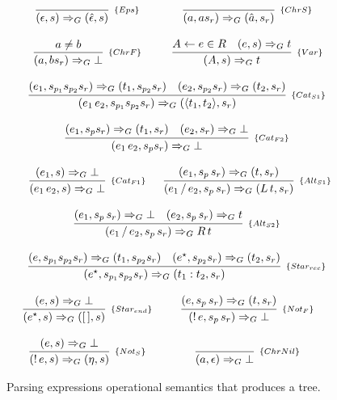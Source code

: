 \begin{figure*}[!h]
   \[
      \begin{array}{cc}
         \infer[_{\{Eps\}}]{(\epsilon,s) \Rightarrow_G (\hat{\epsilon},s)}{} &
         \infer[_{\{ChrS\}}]{(a,as_r) \Rightarrow_G (\hat{a},s_r)}{} \\ \\
         \infer[_{\{ChrF\}}]{(a,bs_r) \Rightarrow_G \bot}{a \neq b} &
         \infer[_{\{Var\}}]{(A,s) \Rightarrow_G t}
                        {A \leftarrow e \in R & (e,s) \Rightarrow_G t} \\ \\
         \multicolumn{2}{c}{
            \infer[_{\{Cat_{S1}\}}]{(e_1\,e_2,s_{p_1}s_{p_2}s_r) \Rightarrow_G (\langle t_1,t_2 \rangle, s_r)}
                                 {(e_1,s_{p_1}s_{p_2}s_r) \Rightarrow_G (t_1,s_{p_2}s_r) &
                                 (e_2,s_{p_2}s_r)\Rightarrow_G (t_2,s_r)}
         } \\ \\
         \multicolumn{2}{c}{
            \infer[_{\{Cat_{F2}\}}]{(e_1\,e_2,s_ps_r) \Rightarrow_G \bot}
                                 { (e_1,s_ps_r) \Rightarrow_G (t_1,s_r) &
                                    (e_2,s_r) \Rightarrow_G \bot}} \\ \\
         \infer[_{\{Cat_{F1}\}}]{(e_1\,e_2,s)\Rightarrow_G \bot}{(e_1,s) \Rightarrow_G \bot} &
         \infer[_{\{Alt_{S1}\}}]{(e_1\,/\,e_2,s_p\,s_r) \Rightarrow_G (L \, t,s_r)}
                                {(e_1,s_p\,s_r)\Rightarrow_G (t,s_r)} \\ \\
         \multicolumn{2}{c}{
            \infer[_{\{Alt_{S2}\}}]{(e_1\,/\,e_2,s_p\,s_r) \Rightarrow_G R \, t}
                                  {(e_1,s_p\,s_r)\Rightarrow_G \bot &
                                   (e_2,s_p\,s_r)\Rightarrow_G t}
         } \\ \\
         \multicolumn{2}{c}{
            \infer[_{\{Star_{rec}\}}]{(e^\star,s_{p_1}s_{p_2}s_r) \Rightarrow_G (t_1 : t_2,s_r)}
                                 {(e,s_{p_1}s_{p_2}s_r) \Rightarrow_G (t_1,s_{p_2}s_r) &
                                  (e^\star, s_{p_2}s_r) \Rightarrow_G (t_2,s_r)}
         } \\ \\
         \infer[_{\{Star_{end}\}}]{(e^\star,s) \Rightarrow_G ([\,],s)}
                                    {(e,s) \Rightarrow_G \bot} &
         \infer[_{\{Not_F\}}]{(!\,e,s_p\,s_r) \Rightarrow_G \bot}
                          {(e,s_p\,s_r) \Rightarrow_G (t,s_r)}\\ \\
         \infer[_{\{Not_S\}}]{(!\,e,s) \Rightarrow_G (\eta,s)}
         {(e,s) \Rightarrow_G \bot}
           &
         \infer[_{\{ChrNil\}}]{(a,\epsilon) \Rightarrow_G \bot}{}
      \end{array}
   \]
   \centering
   \caption{Parsing expressions operational semantics that produces a tree.}
   \label{fig:peg-tree-semantics}
\end{figure*}

